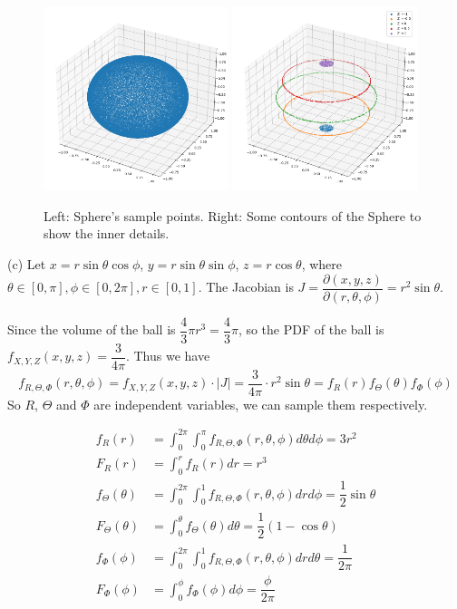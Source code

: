 \begin{homeworkProblem}
\begin{figure}[ht]
    \centering
    \includegraphics[width=0.48\textwidth]{./figure/p7/b_sample.png}
    \includegraphics[width=0.48\textwidth]{./figure/p7/b_contour.png}
    \caption{Left: Sphere's sample points. Right: Some contours of the Sphere to show the inner details.}
\end{figure}


(c) Let $x=r\sin\theta\cos\phi$, $y=r\sin\theta\sin\phi$, $z=r\cos\theta$, where $\theta\in [0, \pi], \phi\in [0, 2\pi], r\in [0, 1]$. The Jacobian is $J=\dfrac{\partial(x, y, z)}{\partial(r, \theta, \phi)}=r^2\sin\theta$.

Since the volume of the ball is $\dfrac{4}{3}\pi r^3=\dfrac{4}{3}\pi$, so the PDF of the ball is $f_{X, Y, Z}(x, y, z)=\dfrac{3}{4\pi}$. Thus we have
$$f_{R, \Theta, \Phi}(r, \theta, \phi)=f_{X, Y, Z}(x, y, z)\cdot|J|=\dfrac{3}{4\pi}\cdot r^2\sin\theta=f_R(r)f_{\Theta}(\theta)f_{\Phi}(\phi)$$
So $R$, $\Theta$ and $\Phi$ are independent variables, we can sample them respectively.

\begin{align*}
f_R(r) &= \int_{0}^{2\pi}\int_{0}^{\pi}f_{R, \Theta, \Phi}(r, \theta, \phi)d\theta d\phi = 3r^2 \\
F_R(r) &= \int_{0}^{r}f_R(r)dr = r^3 \\
f_{\Theta}(\theta) &= \int_{0}^{2\pi}\int_{0}^{1}f_{R, \Theta, \Phi}(r, \theta, \phi)dr d\phi = \dfrac{1}{2}\sin\theta \\
F_{\Theta}(\theta) &= \int_{0}^{\theta}f_{\Theta}(\theta)d\theta = \dfrac{1}{2}(1-\cos\theta) \\
f_{\Phi}(\phi) &= \int_{0}^{2\pi}\int_{0}^{1}f_{R, \Theta, \Phi}(r, \theta, \phi)dr d\theta = \dfrac{1}{2\pi} \\
F_{\Phi}(\phi) &= \int_{0}^{\phi}f_{\Phi}(\phi)d\phi = \dfrac{\phi}{2\pi}
\end{align*}


\end{homeworkProblem}
